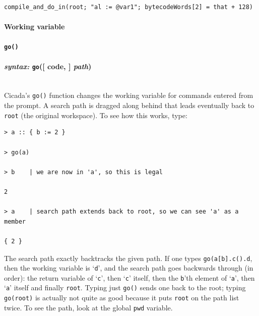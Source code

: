 \documentclass{article}
\newenvironment{code}{
       \begin{list}{}{
               \setlength{\leftmargin}{.4in}
               \setlength{\rightmargin}{0in}
               \setlength{\topsep}{.2in}
       }
       \small
       \item[] }
       { \end{list}   }
\begin{document}
\begin{code} \begin{verbatim}
compile_and_do_in(root; "al := @var1"; bytecodeWords[2] = that + 128)
\end{verbatim} \end{code}





\paragraph{Working variable}



\paragraph{\texttt{go()}\\\\
\normalfont \emph{syntax: } \texttt{go}([ code, ] \emph{path})\\\\}

Cicada's \verb#go()# function changes the working variable for commands entered from the prompt.  A search path is dragged along behind that leads eventually back to \verb#root# (the original workspace).  To see how this works, type:

\begin{code} \begin{verbatim}
> a :: { b := 2 }

> go(a)

> b    | we are now in 'a', so this is legal

2

> a    | search path extends back to root, so we can see 'a' as a member

{ 2 }
\end{verbatim} \end{code}

The search path exactly backtracks the given path.  If one types \verb#go(a[b].c().d#, then the working variable is `\verb#d#', and the search path goes backwards through (in order):  the return variable of `\verb#c#', then `\verb#c#' itself, then the \verb#b#'th element of `\verb#a#', then `\verb#a#' itself and finally \verb#root#.  Typing just \verb#go()# sends one back to the root; typing \verb#go(root)# is actually not quite as good because it puts \verb#root# on the path list twice.  To see the path, look at the global \verb#pwd# variable.
\end{document}
